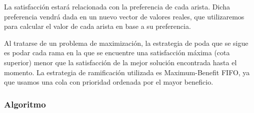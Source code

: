 \documentclass[a4paper, 11pt]{article} %
\begin{document}
	  La satisfacción estará relacionada con la preferencia de cada arista. Dicha preferencia vendrá dada en un 
	  nuevo vector de valores reales, que utilizaremos para calcular el valor de cada arista en base a su preferencia. 
      
      Al tratarse de un problema de maximización, la estrategia de poda que se sigue es podar cada rama en la que se
      encuentre una satisfacción máxima (cota superior) menor que la satisfacción de la mejor solución encontrada hasta el
      momento. La estrategia de ramificación utilizada es Maximum-Benefit FIFO, ya que usamos una cola con prioridad
      ordenada por el mayor beneficio.
    
        \subsubsection{Algoritmo}    
        \small
        \texttt{}
        \normalsize        
    
\end{document}
